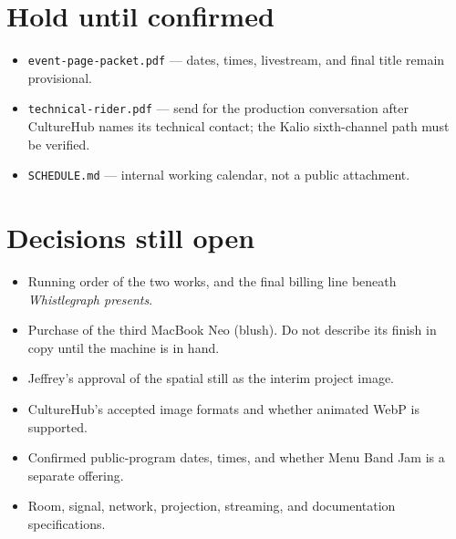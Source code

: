 \documentclass[11pt,letterpaper]{article}
\begin{document}
\section{Hold until confirmed}
\par
\begin{itemize}
\item \texttt{event-page-packet.pdf} — dates, times, livestream, and final title remain provisional.
\item \texttt{technical-rider.pdf} — send for the production conversation after CultureHub names its technical contact; the Kalio sixth-channel path must be verified.
\item \texttt{SCHEDULE.md} — internal working calendar, not a public attachment.
\end{itemize}

\section{Decisions still open}
\begin{itemize}
\item Running order of the two works, and the final billing line beneath \emph{Whistlegraph presents}.
\item Purchase of the third MacBook Neo (blush). Do not describe its finish in copy until the machine is in hand.
\item Jeffrey’s approval of the spatial still as the interim project image.
\item CultureHub’s accepted image formats and whether animated WebP is supported.
\item Confirmed public-program dates, times, and whether Menu Band Jam is a separate offering.
\item Room, signal, network, projection, streaming, and documentation specifications.
\end{itemize}

\palsfooter
{}
\end{document}
